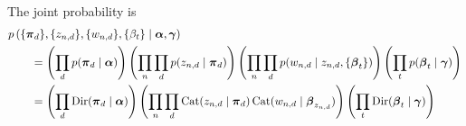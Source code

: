 The joint probability is
\begin{align}
    \hspace{2em}&\hspace{-2em}
    p\left(\{\vec \pi_d\}, \{z_{n, d}\}, \{w_{n, d}\}, \{\beta_t\} \given \vec \alpha, \vec \gamma\right) \\
    &= \left(\prod_d p(\vec \pi_d \given \vec \alpha)\right) \left(\prod_n \prod_d p(z_{n,d} \given \vec \pi_d)\right) \left(\prod_n \prod_d p(w_{n, d} \given z_{n, d}, \{\vec \beta_t\})\right) \left(\prod_t p(\vec \beta_t \given \vec \gamma)\right) \\
    &= \left(\prod_d \Dir(\vec \pi_d \given \vec \alpha)\right) \left(\prod_n \prod_d \Cat(z_{n, d} \given \vec \pi_d) \Cat(w_{n, d} \given \vec \beta_{z_{n, d}})\right) \left(\prod_t \Dir(\vec \beta_t \given \vec \gamma)\right)
\end{align}


